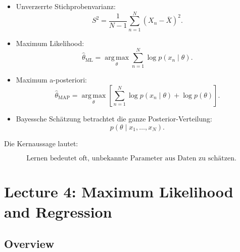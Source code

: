 \documentclass[11pt,a4paper]{scrartcl}
\begin{document}
\begin{answerbox}
\begin{itemize}
        \item Unverzerrte Stichprobenvarianz:
        \[
            S^2
            =
            \frac{1}{N-1}
            \sum_{n=1}^{N}(X_n-\bar X)^2.
        \]

        \item Maximum Likelihood:
        \[
            \hat\theta_{\mathrm{ML}}
            =
            \operatorname*{arg\,max}_{\theta}
            \sum_{n=1}^{N}
            \log p(x_n \mid \theta).
        \]

        \item Maximum a-posteriori:
        \[
            \hat\theta_{\mathrm{MAP}}
            =
            \operatorname*{arg\,max}_{\theta}
            \left[
                \sum_{n=1}^{N}
                \log p(x_n \mid \theta)
                +
                \log p(\theta)
            \right].
        \]

        \item Bayessche Schätzung betrachtet die ganze Posterior-Verteilung:
        \[
            p(\theta \mid x_1,\dots,x_N).
        \]
    \end{itemize}

    Die Kernaussage lautet:

    \[
        \boxed{
            \text{Lernen bedeutet oft, unbekannte Parameter aus Daten zu schätzen.}
        }
    \]
\end{answerbox}

\section{Lecture 4: Maximum Likelihood and Regression}

\subsection{Overview}
\end{document}
